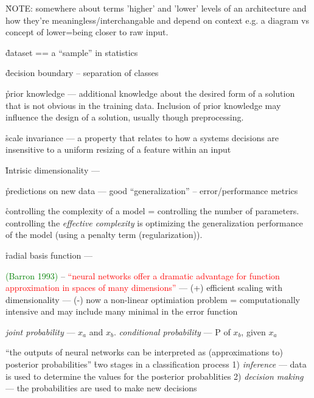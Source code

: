 \r{NOTE: somewhere about terms 'higher' and 'lower' levels of an architecture and how they're meaningless/interchangable and depend on context e.g. a diagram vs concept of lower=being closer to raw input.}

\r{dataset == a ``sample'' in statistics}

\r{decision boundary -- separation of classes}


\r{prior knowledge --- additional knowledge about the desired form of a solution that is not obvious in the training data.  Inclusion of prior knowledge may influence the design of a solution, usually though preprocessing.}


\r{scale invariance --- a property that relates to how a systems decisions are insensitive to a uniform resizing of a feature within an input }

\r{Intrisic dimensionality --- }


\r{predictions on new data --- good ``generalization'' -- error/performance metrics}

\r{controlling the complexity of a model = controlling the number of parameters. controlling the \textit{effective complexity} is optimizing the generalization performance of the model (using a penalty term (regularization)).}


\r{radial basis function --- }


\r{\textcolor{green}{(Barron 1993)} -- \textcolor{red}{``neural networks offer a dramatic advantage for function approximation in spaces of many dimensions''} --- (+) efficient scaling with dimensionality --- (-) now a non-linear optimiation problem = computationally intensive and may include many minimal in the error function}


\r{\textit{joint probability} --- $x_a$ and $x_b$. \textit{conditional probability} --- P of $x_b$, given $x_a$}


\r{``the outputs of neural networks can be interpreted as (approximations to) posterior probabilities''} \r{two stages in a classification process 1) \textit{inference} --- data is used to determine the values for the posterior probablities 2) \textit{decision making} --- the probabilities are used to make new decisions}


